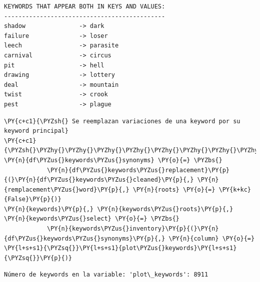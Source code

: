     \begin{Verbatim}[commandchars=\\\{\}]
KEYWORDS THAT APPEAR BOTH IN KEYS AND VALUES:
---------------------------------------------
shadow               -> dark
failure              -> loser
leech                -> parasite
carnival             -> circus
pit                  -> hell
drawing              -> lottery
deal                 -> mountain
twist                -> crook
pest                 -> plague
\end{Verbatim}

    \begin{tcolorbox}[breakable, size=fbox, boxrule=1pt, pad at break*=1mm,colback=cellbackground, colframe=cellborder]
\begin{Verbatim}[commandchars=\\\{\}]
\PY{c+c1}{\PYZsh{} Se reemplazan variaciones de una keyword por su keyword principal}
\PY{c+c1}{\PYZsh{}\PYZhy{}\PYZhy{}\PYZhy{}\PYZhy{}\PYZhy{}\PYZhy{}\PYZhy{}\PYZhy{}\PYZhy{}\PYZhy{}\PYZhy{}\PYZhy{}\PYZhy{}\PYZhy{}\PYZhy{}\PYZhy{}\PYZhy{}\PYZhy{}\PYZhy{}\PYZhy{}\PYZhy{}\PYZhy{}\PYZhy{}\PYZhy{}\PYZhy{}\PYZhy{}\PYZhy{}\PYZhy{}\PYZhy{}\PYZhy{}\PYZhy{}\PYZhy{}\PYZhy{}\PYZhy{}\PYZhy{}\PYZhy{}\PYZhy{}\PYZhy{}\PYZhy{}\PYZhy{}\PYZhy{}\PYZhy{}\PYZhy{}\PYZhy{}\PYZhy{}\PYZhy{}\PYZhy{}\PYZhy{}\PYZhy{}\PYZhy{}\PYZhy{}\PYZhy{}\PYZhy{}\PYZhy{}\PYZhy{}\PYZhy{}\PYZhy{}\PYZhy{}}
\PY{n}{df\PYZus{}keywords\PYZus{}synonyms} \PY{o}{=} \PYZbs{}
            \PY{n}{df\PYZus{}keywords\PYZus{}replacement}\PY{p}{(}\PY{n}{df\PYZus{}keywords\PYZus{}cleaned}\PY{p}{,} \PY{n}{remplacement\PYZus{}word}\PY{p}{,} \PY{n}{roots} \PY{o}{=} \PY{k+kc}{False}\PY{p}{)}   
\PY{n}{keywords}\PY{p}{,} \PY{n}{keywords\PYZus{}roots}\PY{p}{,} \PY{n}{keywords\PYZus{}select} \PY{o}{=} \PYZbs{}
            \PY{n}{keywords\PYZus{}inventory}\PY{p}{(}\PY{n}{df\PYZus{}keywords\PYZus{}synonyms}\PY{p}{,} \PY{n}{column} \PY{o}{=} \PY{l+s+s1}{\PYZsq{}}\PY{l+s+s1}{plot\PYZus{}keywords}\PY{l+s+s1}{\PYZsq{}}\PY{p}{)}
\end{Verbatim}
\end{tcolorbox}

    \begin{Verbatim}[commandchars=\\\{\}]
Número de keywords en la variable: 'plot\_keywords': 8911
\end{Verbatim}

